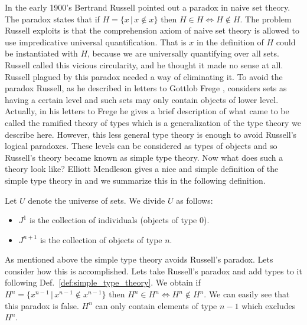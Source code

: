 In the early 1900's Bertrand Russell pointed out a paradox in naive
set theory.  The paradox states that if $H = \{ x\,|\,x \not \in x \}$
then $H \in H \iff H \not \in H$.  The problem Russell exploits is
that the comprehension axiom of naive set theory is allowed to use
impredicative universal quantification. That is $x$ in the definition
of $H$ could be instantiated with $H$, because we are universally
quantifying over all sets.  Russell called this vicious circularity,
and he thought it made no sense at all. Russell plagued by this
paradox needed a way of eliminating it.  To avoid the paradox Russell,
as he described in letters to Gottlob Frege \cite{Hintikka:1995,
  Heijenoort:1967}, considers sets as having a certain level and such
sets may only contain objects of lower level.  Actually, in his
letters to Frege he gives a brief description of what came to be
called the ramified theory of types which is a generalization of the
type theory we describe here.  However, this less general type theory
is enough to avoid Russell's logical paradoxes.  These levels can be
considered as types of objects and so Russell's theory became known as
simple type theory.  Now what does such a theory look like?  Elliott
Mendleson gives a nice and simple definition of the simple type theory
in \cite{Mendelson:2009} and we summarize this in the following
definition.
\begin{definition}
  \label{def:simple_type_theory}
  Let $U$ denote the universe of sets. We divide $U$ as follows:
  \begin{itemize}
  \item $J^1$ is the collection of individuals (objects of type $0$).
  \item $J^{n+1}$ is the collection of objects of type $n$.
  \end{itemize}
\end{definition}
As mentioned above the simple type theory avoids Russell's paradox.
Lets consider how this is accomplished.  Lets take Russell's paradox
and add types to it following Def.~\ref{def:simple_type_theory}.  We
obtain if $H^n = \{ x^{n-1}\,|\,x^{n-1} \not \in x^{n-1} \}$ then $H^n
\in H^n \iff H^n \not \in H^n$.  We can easily see that this paradox is
false.  $H^n$ can only contain elements of type $n-1$ which excludes
$H^n$.

